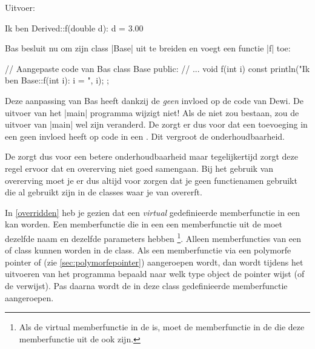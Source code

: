 \begin{cpplstShortInline}
\begin{cpplstfragment}
int main() {
    Derived d;
    d.f(3);
    // ...
\end{cpplstfragment}

Uitvoer:
\begin{coutput}
Ik ben Derived::f(double d): d = 3.00
\end{coutput}

Bas besluit nu om zijn class |Base| uit te breiden en voegt een functie |f| toe:
\begin{cpplstfragment}
// Aangepaste code van Bas
class Base {
public:
    // ...
    void f(int i) const {
        println("Ik ben Base::f(int i): i = {}", i);
    }
};
\end{cpplstfragment}

Deze aanpassing van Bas heeft dankzij de  \emph{geen} invloed op de code van Dewi.
De uitvoer van het |main| programma wijzigt niet! Als de  niet zou bestaan, zou de uitvoer van |main| wel zijn veranderd.
De  zorgt er dus voor dat een toevoeging in een  geen invloed heeft op code in een .
Dit vergroot de onderhoudbaarheid.

De  zorgt dus voor een betere onderhoudbaarheid maar tegelijkertijd zorgt deze regel ervoor dat  en overerving niet goed samengaan.
Bij het gebruik van overerving moet je er dus altijd voor zorgen dat je geen functienamen gebruikt die al gebruikt zijn in de classes waar je van overerft.

In \cref{overridden} heb je gezien dat een \emph{virtual} gedefinieerde memberfunctie in een   kan worden.
Een memberfunctie die in een  een memberfunctie uit de  \emph{} moet dezelfde naam en dezelfde parameters hebben%
\footnote{%
    Als de virtual memberfunctie in de   is, moet de memberfunctie in de  die deze memberfunctie uit de   ook  zijn.
}.
Alleen memberfuncties van een  of  class kunnen  worden in de  class.
Als een  memberfunctie via een polymorfe pointer of  (zie \cref{sec:polymorfepointer}) aangeroepen wordt, dan wordt tijdens het uitvoeren van het programma bepaald naar welk type object de pointer wijst (of de  verwijst).
Pas daarna wordt de in deze class gedefinieerde memberfunctie aangeroepen.


\end{cpplstShortInline}
